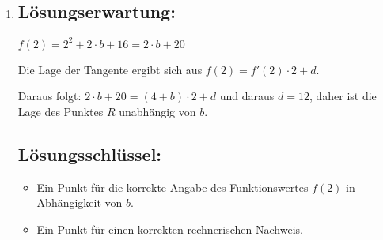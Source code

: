 \begin{langesbeispiel}
{\begin{enumerate}
\begin{itemize}
		$f(x)=0 \Rightarrow x_{1,2}=-\frac{b}{2}\pm\sqrt{\left(-\frac{b}{2}\right)^2-16}$
		
		$\Rightarrow\left(-\frac{b}{2}\right)^2-16=0 \Rightarrow b_1=-8, \hspace{0,5cm}b_2=8$
		
		$\Rightarrow x_1=4, \hspace{0,5cm} x_2=-4 \Rightarrow T_1=(4|0), T_2=(-4|0)$
		\item Tiefpunkt des Graphen von $f$ liegt auf der senkrechten Achse
		
		$\Rightarrow b=0 \Rightarrow T_3=(0|16)$\leer
		
		$g(x)=a\cdot x^2+c$
		
		$g(0)=16 \hspace{1cm} c=16$
		
		$g(4)=0 \Rightarrow 16\cdot a+16=0 \Rightarrow a=-1 \Rightarrow g(x)=-x^2+16$
	\end{itemize}

	\subsection{Lösungsschlüssel:}
	
\begin{itemize}
	\item Ein Punkt für die Angabe aller drei Tiefpunkte
	\item Ein Punkt für die Angabe einer korrekten Funktionsgleichung der Funktion $g$. Äquvalente Funktionsgleichungen sind ebenfalls als richtig zu werten.
\end{itemize}

\item \subsection{Lösungserwartung:}

	$f(2)=2^2+2\cdot b+16=2\cdot b+20$
	
	Die Lage der Tangente ergibt sich aus $f(2)=f'(2)\cdot 2+d$.
	
	Daraus folgt: $2\cdot b+20=(4+b)\cdot 2+d$ und daraus $d=12$, daher ist die Lage des Punktes $R$ unabhängig von $b$.

	\subsection{Lösungsschlüssel:}
	
\begin{itemize}
	\item  Ein Punkt für die korrekte Angabe des Funktionswertes $f(2)$ in Abhängigkeit von $b$.
	\item Ein Punkt für einen korrekten rechnerischen Nachweis.
\end{itemize}
\end{enumerate}}
		\end{langesbeispiel}